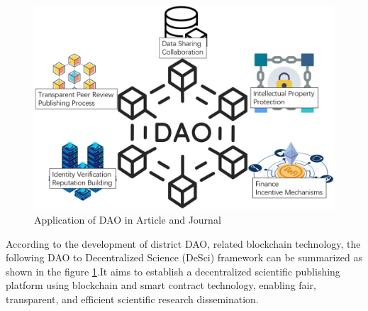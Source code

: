 \documentclass[lettersize,journal]{IEEEtran}
\begin{document}
\begin{figure}[h!]
  \centering
  \includegraphics[width=\linewidth]{assets/dao.png}
  \caption{Application of DAO in Article and Journal}
  \label{fig:applicationofdao}
\end{figure}


According to the development of district DAO, related blockchain technology, the following DAO to Decentralized Science (DeSci) framework can be summarized as shown in the figure \ref{fig:applicationofdao}.It aims to establish a decentralized scientific publishing platform using blockchain and smart contract technology, enabling fair, transparent, and efficient scientific research dissemination.
\end{document}
